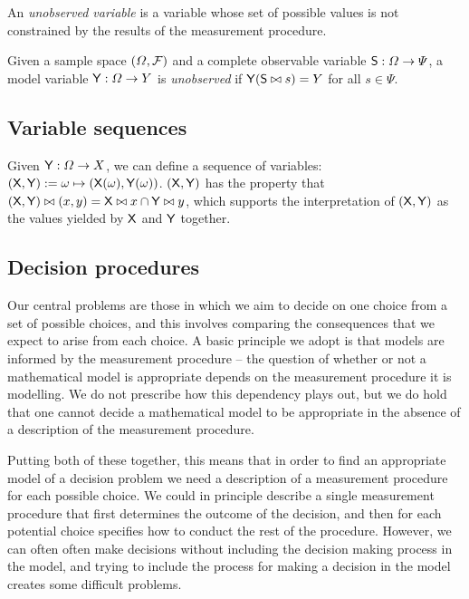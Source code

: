 An \emph{unobserved variable} is a variable whose set of possible values is not constrained by the results of the measurement procedure.

\begin{definition}\label{def:unobserved_variable}
Given a sample space $(\Omega,\mathcal{F})$ and a complete observable variable $\mathsf{S}:\Omega\to\Psi$, a model variable $\mathsf{Y}:\Omega\to Y$ is \emph{unobserved} if $\mathsf{Y}(\mathsf{S}\bowtie s)=Y$ for all $s\in \Psi$.
\end{definition}

\subsection{Variable sequences}

Given $\mathsf{Y}:\Omega\to X$, we can define a sequence of variables: $(\mathsf{X},\mathsf{Y}):=\omega\mapsto (\mathsf{X}(\omega),\mathsf{Y}(\omega))$. $(\mathsf{X},\mathsf{Y})$ has the property that $(\mathsf{X},\mathsf{Y})\bowtie (x,y)= \mathsf{X}\bowtie x\cap \mathsf{Y}\bowtie y$, which supports the interpretation of $(\mathsf{X},\mathsf{Y})$ as the values yielded by $\mathsf{X}$ and $\mathsf{Y}$ together.

\subsection{Decision procedures}\label{sec:actions}

Our central problems are those in which we aim to decide on one choice from a set of possible choices, and this involves comparing the consequences that we expect to arise from each choice. A basic principle we adopt is that models are informed by the measurement procedure -- the question of whether or not a mathematical model is appropriate depends on the measurement procedure it is modelling. We do not prescribe how this dependency plays out, but we do hold that one cannot decide a mathematical model to be appropriate in the absence of a description of the measurement procedure.

Putting both of these together, this means that in order to find an appropriate model of a decision problem we need a description of a measurement procedure for each possible choice. We could in principle describe a single measurement procedure that first determines the outcome of the decision, and then for each potential choice specifies how to conduct the rest of the procedure. However, we can often often make decisions without including the decision making process in the model, and trying to include the process for making a decision in the model creates some difficult problems.

